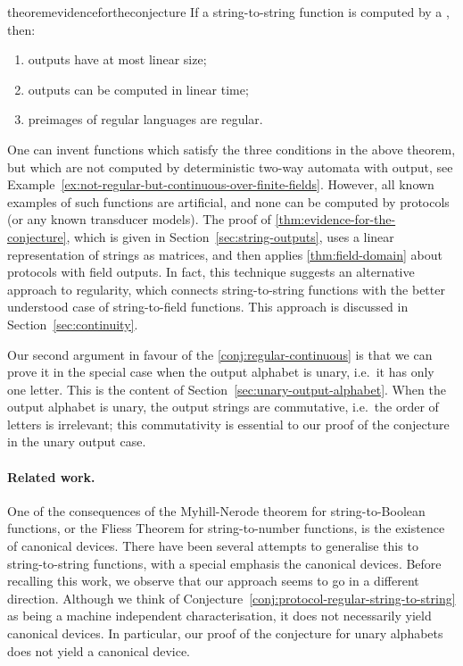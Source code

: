 \begin{restatable}{theorem}{evidencefortheconjecture}
    \label{thm:evidence-for-the-conjecture}
    If a string-to-string function  is  computed by a , then:
    \begin{enumerate}
        \item \label{it:linear-size-outputs} outputs have at most linear size;
        \item \label{it:linear-time-computable} outputs can be   computed in linear time;
        \item \label{it:regular-preimages} preimages of regular languages are regular.
    \end{enumerate}
\end{restatable}

One can invent functions which satisfy the three conditions in the above
theorem, but which are not computed by deterministic two-way automata with output, see
Example~\ref{ex:not-regular-but-continuous-over-finite-fields}. However, all
known examples of such functions  are artificial, and none can be computed by
protocols (or any known transducer models).  The proof of
\cref{thm:evidence-for-the-conjecture}, which is given in
Section~\ref{sec:string-outputs}, uses a linear representation of strings as
matrices, and then applies \cref{thm:field-domain} about protocols with field
outputs. In fact, this technique suggests an alternative approach to regularity,
which connects string-to-string functions with the better understood case of
string-to-field functions. This approach is discussed in
Section~\ref{sec:continuity}.

Our second argument in favour of the \cref{conj:regular-continuous} is that we
can prove it in the special case when the output alphabet is unary, i.e.~it has
only one letter. This is the content of
Section~\ref{sec:unary-output-alphabet}. When the output alphabet is unary, the
output strings are commutative, i.e.~the order of letters is irrelevant; this commutativity is essential to our proof of the conjecture in the unary output case. 



\paragraph*{Related work.} One of the consequences of the Myhill-Nerode theorem
for string-to-Boolean functions, or the Fliess Theorem for string-to-number
functions, is the existence of  canonical devices. There have been several
attempts to generalise this to string-to-string functions, with a special
emphasis the canonical devices. Before recalling this work, we observe that our
approach seems to go in a  different direction. Although we think of
Conjecture~\ref{conj:protocol-regular-string-to-string} as being a machine
independent characterisation, it does not necessarily  yield canonical devices.
In particular, our proof of the conjecture for unary alphabets does not yield a
canonical device.

